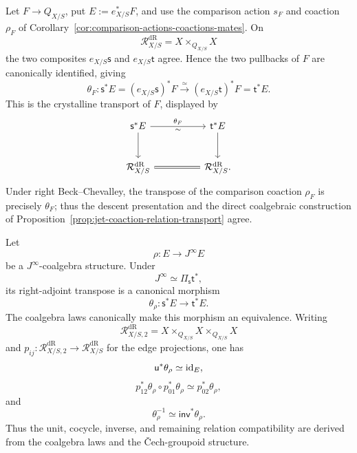 \begin{construction}
\label{con:canonical-descent-action-coaction}
Let \(F\to Q_{X/S}\), put \(E:=e_{X/S}^*F\), and use the comparison action
\(s_F\) and coaction \(\rho_F\) of
Corollary~\ref{cor:comparison-actions-coactions-mates}. On
\[
  \mathcal R^{\mathrm{dR}}_{X/S}=X\times_{Q_{X/S}}X
\]
the two composites \(e_{X/S}\mathsf s\) and \(e_{X/S}\mathsf t\) agree. Hence the two
pullbacks of \(F\) are canonically identified, giving
\[
  \theta_F:
  \mathsf s^*E
  =
  (e_{X/S}\mathsf s)^*F
  \xrightarrow{\simeq}
  (e_{X/S}\mathsf t)^*F
  =
  \mathsf t^*E.
\]
This is the crystalline transport of \(F\), displayed by
\[
\begin{tikzcd}[column sep=huge,row sep=large]
\mathsf s^*E \ar[r,"\theta_F","\sim"']
  \ar[d]
&
\mathsf t^*E \ar[d]\\
\mathcal R^{\mathrm{dR}}_{X/S}
  \ar[r,equal]
&
\mathcal R^{\mathrm{dR}}_{X/S}.
\end{tikzcd}
\]
Under right Beck--Chevalley, the transpose of the comparison coaction \(\rho_F\) is
precisely \(\theta_F\); thus the descent presentation and the direct
coalgebraic construction of
Proposition~\ref{prop:jet-coaction-relation-transport} agree.
\end{construction}

\begin{proposition}
\label{prop:jet-coaction-relation-transport}
Let
\[
  \rho:E\longrightarrow J^\infty E
\]
be a \(J^\infty\)-coalgebra structure. Under
\[
  J^\infty\simeq\Pi_{\mathsf s}\mathsf t^*,
\]
its right-adjoint transpose is a canonical morphism
\[
  \theta_\rho:\mathsf s^*E\longrightarrow \mathsf t^*E.
\]
The coalgebra laws canonically make this morphism an equivalence. Writing
\[
  \mathcal R^{\mathrm{dR}}_{X/S,2}=X\times_{Q_{X/S}}X\times_{Q_{X/S}}X
\]
and \(p_{ij}:\mathcal R^{\mathrm{dR}}_{X/S,2}\to\mathcal R^{\mathrm{dR}}_{X/S}\) for the edge projections, one has
\[
  \mathsf u^*\theta_\rho\simeq\operatorname{id}_E,
\]
\[
  p_{12}^*\theta_\rho\circ p_{01}^*\theta_\rho
  \simeq
  p_{02}^*\theta_\rho,
\]
and
\[
  \theta_\rho^{-1}\simeq\mathsf{inv}^*\theta_\rho.
\]
Thus the unit, cocycle, inverse, and remaining relation compatibility are
derived from the coalgebra laws and the \v{C}ech-groupoid structure.
\end{proposition}

